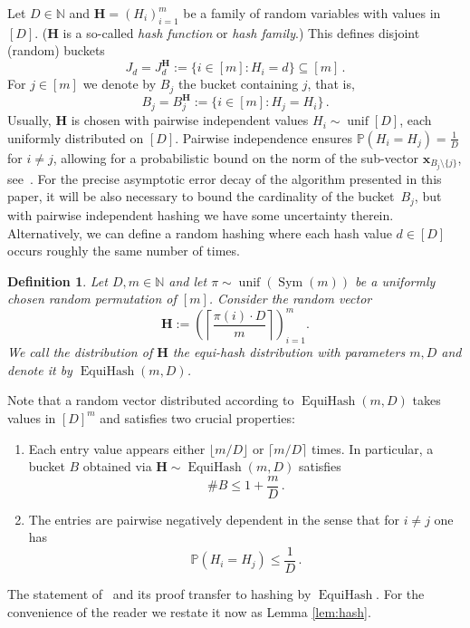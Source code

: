 \documentclass[12pt]{article}
\theoremstyle{plain}
\newtheorem{definition}[theorem]{Definition}
\theoremstyle{definition}
\renewcommand{\P}{{\mathbb P}}
\DeclareMathOperator{\Uniform}{unif}
\DeclareMathOperator{\EquiHash}{EquiHash}
\DeclareMathOperator{\Sym}{Sym}
\renewcommand{\vec}{\boldsymbol}
\newcommand{\N}{{\mathbb N}}
\begin{document}
Let $D \in \N$ and $\vec{H} = (H_i)_{i=1}^m$ be a family of random variables with values in $[D]$.
($\vec{H}$ is a so-called \emph{hash function} or \emph{hash family}.)
This defines disjoint (random) buckets
\begin{equation*}
    J_d = J_d^{\vec{H}} := \{i \in [m] \colon H_i = d\} \subseteq [m]  \,.
\end{equation*}
For $j \in [m]$ we denote by $B_j$ the bucket containing $j$, that is,
\begin{equation} \label{eq:B_j}
    B_j = B_j^{\vec{H}} := \{ i \in [m] : H_j = H_i \}  \,.
\end{equation}
Usually, $\vec{H}$ is chosen with pairwise independent values $H_i \sim \Uniform[D]$, each uniformly distributed on $[D]$. Pairwise independence ensures $\P(H_i=H_j) = \frac{1}{D}$ for $i\neq j$, 
allowing for a probabilistic bound on the norm of the sub-vector $\vec{x}_{B_j \setminus \{j\}}$,
see~\cite[Lemma~2.1]{KW24b}.
For the precise asymptotic error decay of the algorithm presented in this paper,
it will be also necessary to bound the cardinality
of the bucket~$B_j$, but with pairwise independent hashing we have some uncertainty therein.
Alternatively, we can define a random hashing where each hash value $d \in [D]$ occurs roughly the same number of times.

\begin{definition}
Let $D,m \in \mathbb{N}$
and let $\pi \sim \Uniform(\Sym(m))$ be a uniformly chosen random permutation of $[m]$. Consider the random vector
\begin{equation*}
  \vec{H} :=  \left(\left\lceil \frac{\pi(i) \cdot D}{m} \right\rceil\right)_{i=1}^m .
\end{equation*}
We call the distribution of $\vec{H}$ the equi-hash distribution with parameters $m,D$ and denote it by $\EquiHash(m,D)$.
\end{definition}

Note that a random vector distributed according to $\EquiHash(m,D)$ takes values in $[D]^m$ and satisfies two crucial properties:
\begin{enumerate}
    \item Each entry value appears either $\lfloor m/D\rfloor$ or $\lceil m/D \rceil$ times.
        In particular, a bucket $B$ obtained via $\vec{H} \sim \EquiHash(m,D)$ satisfies
        \begin{equation*}
            \#B \leq 1 + \frac{m}{D} \,.
        \end{equation*}
    \item The entries are pairwise negatively dependent in the sense that for $i \neq j$ one has
        \begin{equation*}
            \P(H_i = H_j) \leq \frac{1}{D} \,.
        \end{equation*}
\end{enumerate}
The statement of~\cite[Lemma~2.1]{KW24b} and its proof transfer to hashing by $\EquiHash$.
For the convenience of the reader we restate it now as Lemma \ref{lem:hash}.
\end{document}
